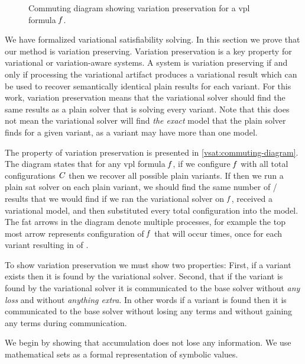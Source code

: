 \label{section:vsat:variation-preservation}
%
\begin{figure}[h]
  \centering
  
  \caption{Commuting diagram showing variation preservation for a \ac{vpl}
    formula $\mathit{f}$.}%
  \label{vsat:commuting-diagram}
\end{figure}
%
We have formalized variational satisfiability solving. In this section we prove
that our method is variation preserving. Variation preservation is a key
property for variational or variation-aware systems. A system is variation
preserving if and only if processing the variational artifact produces a
variational result which can be used to recover semantically identical plain
results for each variant. For this work, variation preservation means that the
variational solver should find the same results as a plain solver that is
solving every variant. Note that this does not mean the variational solver will
find \emph{the exact} model that the plain solver finds for a given variant, as
a variant may have more than one model.

The property of variation preservation is presented in
\autoref{vsat:commuting-diagram}. The diagram states that for any \ac{vpl}
formula $\mathit{f}$, if we configure $\mathit{f}$ with all total configurations
$\mathit{C}$ then we recover all possible plain variants. If then we run a plain
\ac{sat} solver on each plain variant, we should find the same number of
/ results that we would find if we ran the variational solver
on $\mathit{f}$, received a variational model, and then substituted every total
configuration into the model. The fat arrows in the diagram denote multiple
processes, for example the top most arrow represents configuration of $\mathit{f}$
that will occur  times, once for each variant
resulting in  of .

To show variation preservation we must show two properties: First, if a variant
exists then it is found by the variational solver. Second, that if the variant
is found by the variational solver it is communicated to the base solver without
\emph{any loss} and without \emph{anything extra}. In other words if a variant
is found then it is communicated to the base solver without losing any terms and
without gaining any terms during communication.

We begin by showing that accumulation does not lose any information. We use
mathematical sets as a formal representation of symbolic values.

